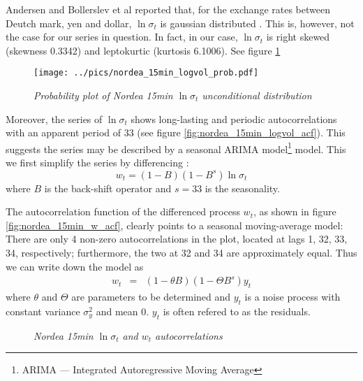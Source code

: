 Andersen and Bollerslev et al reported that, for the exchange
rates between Deutch mark, yen and dollar, $\ln \sigma_t$ is
gaussian distributed \cite{Andersen03}. This is, however, not the case
for our series in question. In fact, in our case, $\ln \sigma_t$ is
right skewed (skewness 0.3342) and leptokurtic (kurtosis 
6.1006). See figure \ref{fig:nordea_15min_logvol_prob}
\begin{figure}[htb!]
  \centering
  \texttt{[image: ../pics/nordea\_15min\_logvol\_prob.pdf]}
  \caption{\small \it Probability plot of Nordea 15min
    $\ln\sigma_t$ unconditional distribution}
  \label{fig:nordea_15min_logvol_prob}
\end{figure}
Moreover, the series of $\ln\sigma_t$ shows long-lasting and
periodic autocorrelations with an apparent period of 33 (see figure
\ref{fig:nordea_15min_logvol_acf}). This suggests the series may be
described by a seasonal ARIMA model\footnote{ARIMA ---
  Integrated Autoregressive Moving Average} model. This we first
simplify the series by differencing \cite{BoxJenkins94}:
\[
w_t = (1-B)(1-B^s)\ln\sigma_t
\]
where $B$ is the back-shift operator and $s=33$ is the seasonality.

The autocorrelation function of the differenced process $w_t$, as
shown in figure \ref{fig:nordea_15min_w_acf}, clearly points to a seasonal
moving-average model: There are only 4 non-zero autocorrelations in
the plot, located at lags 1, 32, 33, 34, respectively; furthermore,
the two at 32 and 34 are approximately equal. Thus we can write down
the model as
\begin{eqnarray}
  w_t &=& (1 - \theta B)(1 - \Theta B^s) y_t \label{eq:nordea_w}
\end{eqnarray}
where $\theta$ and $\Theta$ are parameters to be determined and $y_t$
is a noise process with constant variance $\sigma_y^2$ and mean
0. $y_t$ is often refered to as the residuals.
\begin{figure}[htb!]
  \centering
  \caption{\small \it Nordea 15min $\ln\sigma_t$ and $w_t$
    autocorrelations}
  \label{fig:nordea1_15min_acf}
\end{figure}

